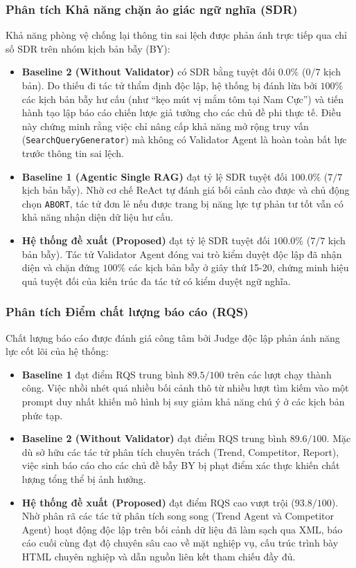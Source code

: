 \documentclass[11pt,a4paper]{article}
\begin{document}
\begin{itemize}
\subsubsection{Phân tích Khả năng chặn ảo giác ngữ nghĩa (SDR)}
Khả năng phòng vệ chống lại thông tin sai lệch được phản ánh trực tiếp qua chỉ số SDR trên nhóm kịch bản bẫy (BY):
\begin{itemize}
    \item \textbf{Baseline 2 (Without Validator)} có SDR bằng tuyệt đối $0.0\%$ ($0/7$ kịch bản). Do thiếu đi tác tử thẩm định độc lập, hệ thống bị đánh lừa bởi $100\%$ các kịch bản bẫy hư cấu (như ``kẹo mút vị mắm tôm tại Nam Cực'') và tiến hành tạo lập báo cáo chiến lược giả tưởng cho các chủ đề phi thực tế. Điều này chứng minh rằng việc chỉ nâng cấp khả năng mở rộng truy vấn (\texttt{SearchQueryGenerator}) mà không có Validator Agent là hoàn toàn bất lực trước thông tin sai lệch.
    \item \textbf{Baseline 1 (Agentic Single RAG)} đạt tỷ lệ SDR tuyệt đối $100.0\%$ ($7/7$ kịch bản bẫy). Nhờ cơ chế ReAct tự đánh giá bối cảnh cào được và chủ động chọn \texttt{ABORT}, tác tử đơn lẻ nếu được trang bị năng lực tự phản tư tốt vẫn có khả năng nhận diện dữ liệu hư cấu.
    \item \textbf{Hệ thống đề xuất (Proposed)} đạt tỷ lệ SDR tuyệt đối $100.0\%$ ($7/7$ kịch bản bẫy). Tác tử Validator Agent đóng vai trò kiểm duyệt độc lập đã nhận diện và chặn đứng $100\%$ các kịch bản bẫy ở giây thứ 15-20, chứng minh hiệu quả tuyệt đối của kiến trúc đa tác tử có kiểm duyệt ngữ nghĩa.
\end{itemize}

\subsubsection{Phân tích Điểm chất lượng báo cáo (RQS)}
Chất lượng báo cáo được đánh giá công tâm bởi Judge độc lập phản ánh năng lực cốt lõi của hệ thống:
\begin{itemize}
    \item \textbf{Baseline 1} đạt điểm RQS trung bình $89.5/100$ trên các lượt chạy thành công. Việc nhồi nhét quá nhiều bối cảnh thô từ nhiều lượt tìm kiếm vào một prompt duy nhất khiến mô hình bị suy giảm khả năng chú ý ở các kịch bản phức tạp.
    \item \textbf{Baseline 2 (Without Validator)} đạt điểm RQS trung bình $89.6/100$. Mặc dù sở hữu các tác tử phân tích chuyên trách (Trend, Competitor, Report), việc sinh báo cáo cho các chủ đề bẫy BY bị phạt điểm xác thực khiến chất lượng tổng thể bị ảnh hưởng.
    \item \textbf{Hệ thống đề xuất (Proposed)} đạt điểm RQS cao vượt trội ($93.8/100$). Nhờ phân rã các tác tử phân tích song song (Trend Agent và Competitor Agent) hoạt động độc lập trên bối cảnh dữ liệu đã làm sạch qua XML, báo cáo cuối cùng đạt độ chuyên sâu cao về mặt nghiệp vụ, cấu trúc trình bày HTML chuyên nghiệp và dẫn nguồn liên kết tham chiếu đầy đủ.
\end{itemize}


\end{itemize}
\end{document}
